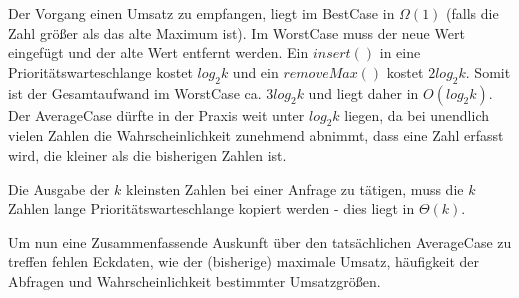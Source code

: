 \documentclass{article}
\begin{document}
Der Vorgang einen Umsatz zu empfangen, liegt im BestCase in $\Omega(1)$ (falls die Zahl größer als das alte
Maximum ist). Im WorstCase muss der neue Wert eingefügt und der alte Wert entfernt werden. Ein $insert()$
in eine Prioritätswarteschlange kostet $log_2k$ und ein $removeMax()$ kostet $2log_2k$. Somit ist der 
Gesamtaufwand im WorstCase ca. $3log_2k$ und liegt daher in $O(log_2k)$. Der AverageCase dürfte in der Praxis
weit unter $log_2k$ liegen, da bei unendlich vielen Zahlen die Wahrscheinlichkeit zunehmend abnimmt, dass
eine Zahl erfasst wird, die kleiner als die bisherigen Zahlen ist.

Die Ausgabe der $k$ kleinsten Zahlen bei einer Anfrage zu tätigen, muss die $k$ Zahlen lange Prioritätswarteschlange
kopiert werden - dies liegt in $\Theta(k)$.

Um nun eine Zusammenfassende Auskunft über den tatsächlichen AverageCase zu treffen fehlen Eckdaten, wie
der (bisherige) maximale Umsatz, häufigkeit der Abfragen und Wahrscheinlichkeit bestimmter Umsatzgrößen.
\end{document}
